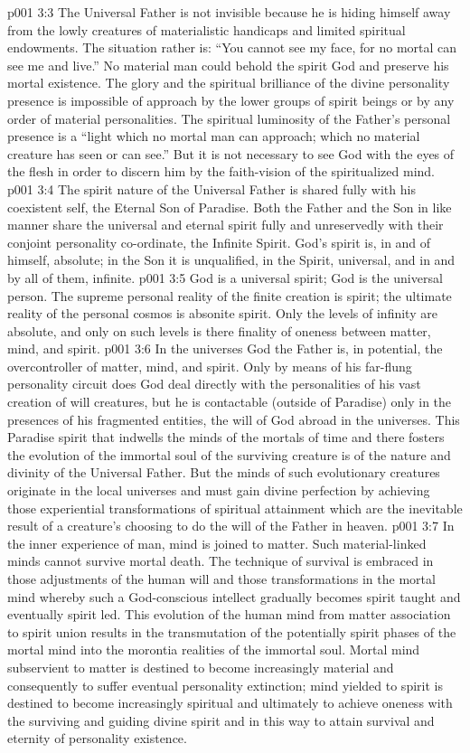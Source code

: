 \vs p001 3:3 The Universal Father is not invisible because he is hiding himself away from the lowly creatures of materialistic handicaps and limited spiritual endowments. The situation rather is: “You cannot see my face, for no mortal can see me and live.” No material man could behold the spirit God and preserve his mortal existence. The glory and the spiritual brilliance of the divine personality presence is impossible of approach by the lower groups of spirit beings or by any order of material personalities. The spiritual luminosity of the Father’s personal presence is a “light which no mortal man can approach; which no material creature has seen or can see.” But it is not necessary to see God with the eyes of the flesh in order to discern him by the faith\hyp{}vision of the spiritualized mind.
\vs p001 3:4 \pc The spirit nature of the Universal Father is shared fully with his coexistent self, the Eternal Son of Paradise. Both the Father and the Son in like manner share the universal and eternal spirit fully and unreservedly with their conjoint personality co\hyp{}ordinate, the Infinite Spirit. God’s spirit is, in and of himself, absolute; in the Son it is unqualified, in the Spirit, universal, and in and by all of them, infinite.
\vs p001 3:5 \pc God is a universal spirit; God is the universal person. The supreme personal reality of the finite creation is spirit; the ultimate reality of the personal cosmos is absonite spirit. Only the levels of infinity are absolute, and only on such levels is there finality of oneness between matter, mind, and spirit.
\vs p001 3:6 \pc In the universes God the Father is, in potential, the overcontroller of matter, mind, and spirit. Only by means of his far\hyp{}flung personality circuit does God deal directly with the personalities of his vast creation of will creatures, but he is contactable (outside of Paradise) only in the presences of his fragmented entities, the will of God abroad in the universes. This Paradise spirit that indwells the minds of the mortals of time and there fosters the evolution of the immortal soul of the surviving creature is of the nature and divinity of the Universal Father. But the minds of such evolutionary creatures originate in the local universes and must gain divine perfection by achieving those experiential transformations of spiritual attainment which are the inevitable result of a creature’s choosing to do the will of the Father in heaven.
\vs p001 3:7 \pc In the inner experience of man, mind is joined to matter. Such material\hyp{}linked minds cannot survive mortal death. The technique of survival is embraced in those adjustments of the human will and those transformations in the mortal mind whereby such a God\hyp{}conscious intellect gradually becomes spirit taught and eventually spirit led. This evolution of the human mind from matter association to spirit union results in the transmutation of the potentially spirit phases of the mortal mind into the morontia realities of the immortal soul. Mortal mind subservient to matter is destined to become increasingly material and consequently to suffer eventual personality extinction; mind yielded to spirit is destined to become increasingly spiritual and ultimately to achieve oneness with the surviving and guiding divine spirit and in this way to attain survival and eternity of personality existence.
